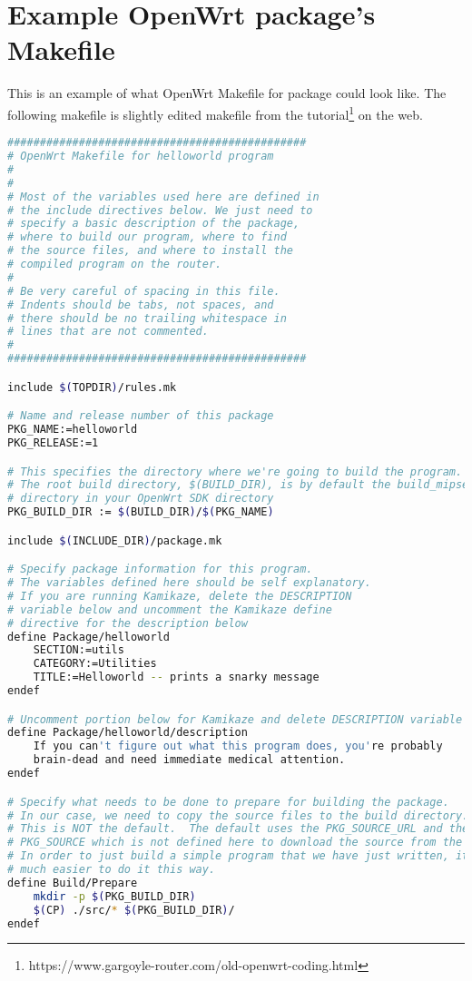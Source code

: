 \chapter{Example OpenWrt package's Makefile}\label{hello_mkfile}
This is an example of what OpenWrt Makefile for package could look like.
The following makefile is slightly edited makefile from the tutorial\footnote{https://www.gargoyle-router.com/old-openwrt-coding.html} on the web.
\begin{lstlisting}[language=bash,basicstyle=\ttfamily\footnotesize,caption=Makefile for Helloworld.]
##############################################
# OpenWrt Makefile for helloworld program
#
#
# Most of the variables used here are defined in
# the include directives below. We just need to
# specify a basic description of the package,
# where to build our program, where to find
# the source files, and where to install the
# compiled program on the router.
#
# Be very careful of spacing in this file.
# Indents should be tabs, not spaces, and
# there should be no trailing whitespace in
# lines that are not commented.
#
##############################################

include $(TOPDIR)/rules.mk

# Name and release number of this package
PKG_NAME:=helloworld
PKG_RELEASE:=1

# This specifies the directory where we're going to build the program.
# The root build directory, $(BUILD_DIR), is by default the build_mipsel
# directory in your OpenWrt SDK directory
PKG_BUILD_DIR := $(BUILD_DIR)/$(PKG_NAME)

include $(INCLUDE_DIR)/package.mk

# Specify package information for this program.
# The variables defined here should be self explanatory.
# If you are running Kamikaze, delete the DESCRIPTION
# variable below and uncomment the Kamikaze define
# directive for the description below
define Package/helloworld
	SECTION:=utils
	CATEGORY:=Utilities
	TITLE:=Helloworld -- prints a snarky message
endef

# Uncomment portion below for Kamikaze and delete DESCRIPTION variable above
define Package/helloworld/description
	If you can't figure out what this program does, you're probably
	brain-dead and need immediate medical attention.
endef

# Specify what needs to be done to prepare for building the package.
# In our case, we need to copy the source files to the build directory.
# This is NOT the default.  The default uses the PKG_SOURCE_URL and the
# PKG_SOURCE which is not defined here to download the source from the web.
# In order to just build a simple program that we have just written, it is
# much easier to do it this way.
define Build/Prepare
	mkdir -p $(PKG_BUILD_DIR)
	$(CP) ./src/* $(PKG_BUILD_DIR)/
endef


\end{lstlisting}

